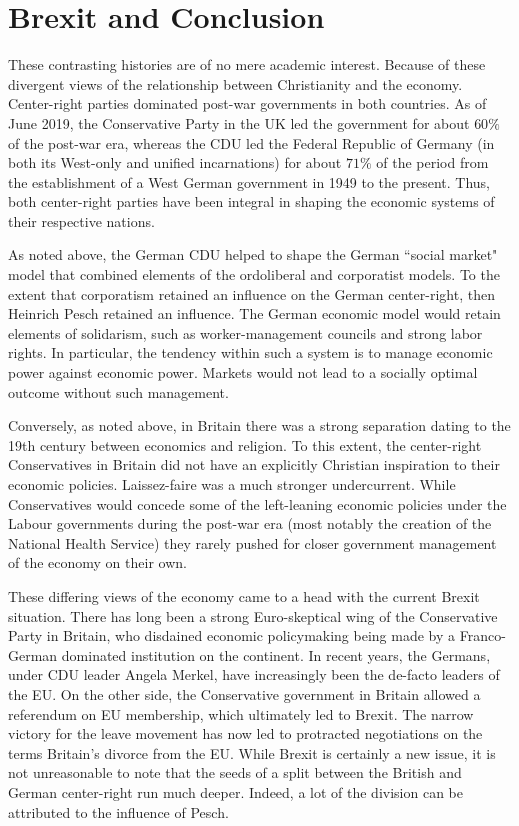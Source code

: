 \documentclass{article}
\begin{document}
\section{Brexit and Conclusion}

These contrasting histories are of no mere academic interest.  Because of these divergent views of the relationship between Christianity and the economy.  Center-right parties dominated post-war governments in both countries.  As of June 2019, the Conservative Party in the UK led the government for about $ 60\% $ of the post-war era, whereas the CDU led the Federal Republic of Germany (in both its West-only and unified incarnations) for about $ 71\% $ of the period from the establishment of a West German government in 1949 to the present.  Thus, both center-right parties have been integral in shaping the economic systems of their respective nations.\medskip

As noted above, the German CDU helped to shape the German ``social market" model that combined elements of the ordoliberal and corporatist models.  To the extent that corporatism retained an influence on the German center-right, then Heinrich Pesch retained an influence.  The German economic model would retain elements of solidarism, such as worker-management councils and strong labor rights.  In particular, the tendency within such a system is to manage economic power against economic power.  Markets would not lead to a socially optimal outcome without such management.\medskip

Conversely, as noted above, in Britain there was a strong separation dating to the 19th century between economics and religion.  To this extent, the center-right Conservatives in Britain did not have an explicitly Christian inspiration to their economic policies.  Laissez-faire was a much stronger undercurrent.  While Conservatives would concede some of the left-leaning economic policies under the Labour governments during the post-war era (most notably the creation of the National Health Service) they rarely pushed for closer government management of the economy on their own.\medskip

These differing views of the economy came to a head with the current Brexit situation.  There has long been a strong Euro-skeptical wing of the Conservative Party in Britain, who disdained economic policymaking being made by a Franco-German dominated institution on the continent.  In recent years, the Germans, under CDU leader Angela Merkel, have increasingly been the de-facto leaders of the EU.  On the other side, the Conservative government in Britain allowed a referendum on EU membership, which ultimately led to Brexit.  The narrow victory for the leave movement has now led to protracted negotiations on the terms Britain’s divorce from the EU.  While Brexit is certainly a new issue, it is not unreasonable to note that the seeds of a split between the British and German center-right run much deeper.  Indeed, a lot of the division can be attributed to the influence of Pesch.

\printbibliography
\end{document}
